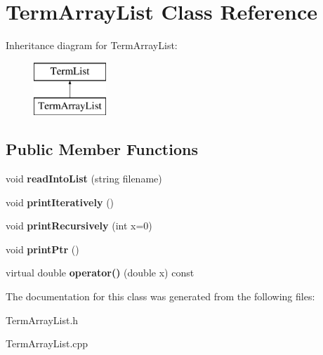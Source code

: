 \hypertarget{classTermArrayList}{\section{Term\-Array\-List Class Reference}
\label{classTermArrayList}
}
Inheritance diagram for Term\-Array\-List\-:\begin{figure}[H]
\begin{center}
\leavevmode
\includegraphics[height=2.000000cm]{classTermArrayList}
\end{center}
\end{figure}
\subsection*{Public Member Functions}
\begin{DoxyCompactItemize}
\item 
\hypertarget{classTermArrayList_a7abb9dc265a5d89e31bfa9caf0a0add3}{void {\bfseries read\-Into\-List} (string filename)}\label{classTermArrayList_a7abb9dc265a5d89e31bfa9caf0a0add3}

\item 
\hypertarget{classTermArrayList_a1c6a97fd1ba740bcddd6ee257ff4a088}{void {\bfseries print\-Iteratively} ()}\label{classTermArrayList_a1c6a97fd1ba740bcddd6ee257ff4a088}

\item 
\hypertarget{classTermArrayList_a6777d9358149d683902610c24c4752f6}{void {\bfseries print\-Recursively} (int x=0)}\label{classTermArrayList_a6777d9358149d683902610c24c4752f6}

\item 
\hypertarget{classTermArrayList_a0619e7312f7af5c17ef029995029fa0d}{void {\bfseries print\-Ptr} ()}\label{classTermArrayList_a0619e7312f7af5c17ef029995029fa0d}

\item 
\hypertarget{classTermArrayList_a890facace1b1acd72df0f500d9279a04}{virtual double {\bfseries operator()} (double x) const }\label{classTermArrayList_a890facace1b1acd72df0f500d9279a04}

\end{DoxyCompactItemize}


The documentation for this class was generated from the following files\-:\begin{DoxyCompactItemize}
\item 
Term\-Array\-List.\-h\item 
Term\-Array\-List.\-cpp\end{DoxyCompactItemize}
